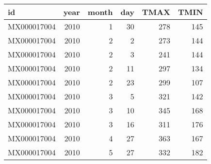 \begin{tabular}{lrrrrr}
  \toprule
 id & year & month & day & TMAX & TMIN \\ 
  \midrule
  MX000017004 & 2010 &   1 &  30 & 278 & 145 \\ 
  MX000017004 & 2010 &   2 &   2 & 273 & 144 \\ 
  MX000017004 & 2010 &   2 &   3 & 241 & 144 \\ 
  MX000017004 & 2010 &   2 &  11 & 297 & 134 \\ 
  MX000017004 & 2010 &   2 &  23 & 299 & 107 \\ 
  MX000017004 & 2010 &   3 &   5 & 321 & 142 \\ 
  MX000017004 & 2010 &   3 &  10 & 345 & 168 \\ 
  MX000017004 & 2010 &   3 &  16 & 311 & 176 \\ 
  MX000017004 & 2010 &   4 &  27 & 363 & 167 \\ 
  MX000017004 & 2010 &   5 &  27 & 332 & 182 \\ 
   \bottomrule
\end{tabular}
